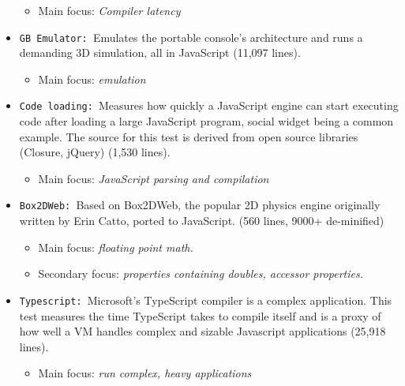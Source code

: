 \begin{itemize}
  \begin{itemize}
    \item Main focus: \textit{Compiler latency}
  \end{itemize}
  \item \texttt{GB Emulator: }Emulates the portable console's architecture and runs a demanding 3D simulation, all in JavaScript (11,097 lines).
  \begin{itemize}
    \item Main focus: \textit{emulation}
  \end{itemize}
    \item \texttt{Code loading: }Measures how quickly a JavaScript engine can start executing code after loading a large JavaScript program, social widget being a common example. The source for this test is derived from open source libraries (Closure, jQuery) (1,530 lines).
  \begin{itemize}
    \item Main focus: \textit{JavaScript parsing and compilation}
  \end{itemize}
    \item \texttt{Box2DWeb: }Based on Box2DWeb, the popular 2D physics engine originally written by Erin Catto, ported to JavaScript. (560 lines, 9000+ de-minified)
  \begin{itemize}
    \item Main focus: \textit{floating point math.}
    \item Secondary focus: \textit{properties containing doubles, accessor properties.}
  \end{itemize}
    \item \texttt{Typescript: }Microsoft's TypeScript compiler is a complex application. This test measures the time TypeScript takes to compile itself and is a proxy of how well a VM handles complex and sizable Javascript applications (25,918 lines).
  \begin{itemize}
    \item Main focus: \textit{run complex, heavy applications}
  \end{itemize}
\end{itemize}
